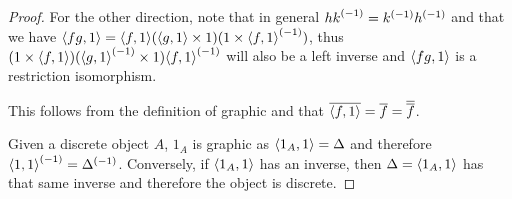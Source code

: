 \begin{proof}
For the other direction, note that in general ${h k}^{(-1)} = {k}^{(-1)}{h}^{(-1)}$ and that
we have $\langle f g,1\rangle = \langle f,1\rangle (\langle g,1\rangle\times 1)  (1 \times {\langle f,1\rangle}^{(-1)})$, thus
 $(1\times \langle f,1\rangle)  ({\langle g,1\rangle}^{(-1)}\times 1) {\langle f,1\rangle}^{(-1)}$ will also be a left inverse and
$\langle f g,1\rangle$ is a restriction isomorphism.

\item This follows from the definition of graphic and that
 $\overline{\langle f,1\rangle} = \overline{f} = \overline{\overline{f}}$.

\item Given a discrete object $A$, $1_A$ is graphic as $\langle1_A,1\rangle = \Delta$ and therefore
${\langle1,1\rangle}^{(-1)} =
{\Delta}^{(-1)}$. Conversely, if $\langle1_A,1\rangle$ has an inverse, then $\Delta = \langle1_A,1\rangle$ has that same
inverse and therefore the object is discrete.
\eproofenum
\end{proof}


